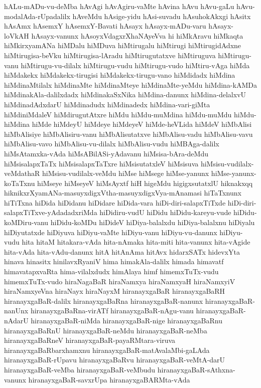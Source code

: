 {hALu-mADu-vu-deMba
hAvAgi
hAvAgiru-vaMte
hAvina
hAvu
hAvu-gaLu
hAvu-modalAda-rUpadalilx
hAveMdu
hAsige-yidu
hAsi-suvadu
hAsuhokAkxgi
hAsitx
hAsAmx
hAsemxY
hAsemxY-Bavati
hAsayx
hAsayx-mADu-varu
hAsayx-loVkAH
hAsayx-vanunx
hAsoyxVdagxrXhaNAyeVva
hi
hiMkAravu
hiMkaqta
hiMkirxyamANa
hiMDalu
hiMDuva
hiMtirugalu
hiMtirugi
hiMtirugidAdxne
hiMtirugisa-beVku
hiMtirugisa-lAradu
hiMtirugutatxve
hiMtiruguva
hiMtirugu-vanu
hiMtirugu-vu-dilalx
hiMtirugu-vudu
hiMtirugu-vudo
hiMtiru-vAga
hiMda
hiMdakekx
hiMdakekx-tirugisi
hiMdakekx-tirugu-vano
hiMdidadx
hiMdina
hiMdinaMtilalx
hiMdinaMte
hiMdinaMteye
hiMdinaMte-yeMdu
hiMdina-kAMDa
hiMdinakAla-dalilxdadx
hiMdinakaSxNika
hiMdina-danunx
hiMdina-delalxvU
hiMdinadAdxdarU
hiMdinadudx
hiMdinadedx
hiMdina-vari-giMta
hiMdiniMdaleV
hiMdirugutAtxre
hiMdu
hiMdu-muMdina
hiMdu-muMdu
hiMdu-hiMdina
hiMde
hiMdeyU
hiMdeye
hiMdeyeV
hiMde-heVLida
hiMdeV
hiMbAlisi
hiMbAlisiye
hiMbAlisiru-vanu
hiMbAlisutatxve
hiMbAlisu-vadu
hiMbAlisu-vavu
hiMbAlisu-vavo
hiMbAlisu-vu-dilalx
hiMbAlisu-vudu
hiMBAga-dalilx
hiMsAtamxka-vAda
hiMsABilASi-yAdavanu
hiMsisa-bAra-deMdu
hiMsisalapxTaTx
hiMsisalapxTaTxre
hiMsisutatxleV
hiMsisuva
hiMsisu-vudilalx-veMdathaR
hiMsisu-vudilalx-veMdu
hiMse
hiMsege
hiMse-yanunx
hiMse-yanunx-koTaTxnu
hiMseye
hiMseyeV
hiMsAyxtf
hiH
higeMdu
higigxsutatxlU
hiknakxqq
hiknikxrXyamANa-masuyxdigxVtha-masuyxdigxVya-mAnamasi
hiTaTxnunx
hiTiTxna
hiDida
hiDidanu
hiDidare
hiDida-vara
hiDi-diri-salapxTiTxde
hiDi-diri-salapxTiTxve-yAdadadxriMda
hiDidiru-vudU
hiDidu
hiDidu-kareyu-vude
hiDidu-koMDiru-vanu
hiDidu-koMDu
hiDideV
hiDiya-balalxdu
hiDiya-balalxnu
hiDiyalu
hiDiyutatxde
hiDiyuva
hiDiyu-vaMte
hiDiyu-vanu
hiDiyu-vu-danunx
hiDiyu-vudu
hita
hitaM
hitakara-vAda
hita-nAmaka
hita-miti
hita-vanunx
hita-vAgide
hita-vAda
hita-vAdu-danunx
hitA
hitAnAma
hitAvx
hidarxSATx
hidevxYta
hinava
hinasitx
hinilavxRyaniV
hima
himakAla-dalilx
himada
himavatf
himavatapxvaRta
hima-vilalxdudx
himAlaya
himf
himemxTuTx-vudu
himemxTuTx-vudo
hiraNagaBaR
hiraNamxya
hiraNamxyaH
hiraNamxyiV
hiraNamxyeVna
hiraNayx
hiraNayxM
hiranayxgaBaR
hiranayxgaBaRH
hiranayxgaBaR-dalilx
hiranayxgaBaRna
hiranayxgaBaR-nanunx
hiranayxgaBaR-nanUnx
hiranayxgaBaRna-virATf
hiranayxgaBaR-nAgu-vanu
hiranayxgaBaR-nAdarU
hiranayxgaBaR-niMda
hiranayxgaBaR-nige
hiranayxgaBaRnu
hiranayxgaBaRnU
hiranayxgaBaR-neMdu
hiranayxgaBaR-neMba
hiranayxgaBaRneV
hiranayxgaBaR-payaRMtara-viruva
hiranayxgaBaRbarxhamxnu
hiranayxgaBaR-matAvalaMbi-gaLAda
hiranayxgaBaR-rUpavu
hiranayxgaBaRvu
hiranayxgaBaR-veMtA-darU
hiranayxgaBaR-veMba
hiranayxgaBaR-veMbudu
hiranayxgaBaR-sAthxna-vanunx
hiranayxgaBaR-savxrUpa
hiranayxgaBARMta-vAda
}
